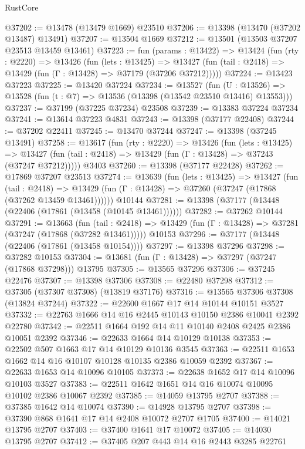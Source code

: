 \begin{lexlean}{RustCore}
\begin{coremodule}
@37202 := @13478 (@13479 @1669) @23510
@37206 := @13398 (@13470 (@37202 @13487) @13491)
@37207 := @13504 @1669
@37212 := @13501 (@13503 @37207 @23513 @13459 @13461)
@37223 := fun (params : @13422) =>
  @13424
    (fun (rty : @2220) =>
    @13426
      (fun (lets : @13425) =>
      @13427 (fun (tail : @2418) => @13429 (fun (Γ : @13428) => @37179 (@37206 @37212)))))
@37224 := @13423 @37223
@37225 := @13420 @37224
@37234 := @13527
    (fun (U : @13526) => @13528 (fun (t : @7) => @13536 (@13398 (@13542 @23510 @13416) @13553)))
@37237 := @37199 (@37225 @37234) @23508
@37239 := @13383 @37224 @37234
@37241 := @13614 @37223 @4831
@37243 := @13398 (@37177 @22408)
@37244 := @37202 @22411
@37245 := @13470 @37244
@37247 := @13398 (@37245 @13491)
@37258 := @13617
    (fun (rty : @2220) =>
    @13426
      (fun (lets : @13425) =>
      @13427 (fun (tail : @2418) => @13429 (fun (Γ : @13428) => @37243 (@37247 @37212)))))
    @3403
@37260 := @13398 (@37177 @22428)
@37262 := @17869 @37207 @23513
@37274 := @13639
    (fun (lets : @13425) =>
    @13427
      (fun (tail : @2418) =>
      @13429 (fun (Γ : @13428) => @37260 (@37247 (@17868 (@37262 @13459 @13461))))))
    @10144
@37281 := @13398 (@37177 (@13448 (@22406 (@17861 (@13458 (@10145 @13461))))))
@37282 := @37262 @10144
@37291 := @13663
    (fun (tail : @2418) => @13429 (fun (Γ : @13428) => @37281 (@37247 (@17868 (@37282 @13461)))))
    @10153
@37296 := @37177 (@13448 (@22406 (@17861 (@13458 @10154))))
@37297 := @13398 @37296
@37298 := @37282 @10153
@37304 := @13681 (fun (Γ : @13428) => @37297 (@37247 (@17868 @37298))) @13795
@37305 := @13565 @37296
@37306 := @37245 @22476
@37307 := @13398 @37306
@37308 := @22480 @37298
@37312 := @37305 (@37307 @37308) (@13819 @37176)
@37316 := @13565 @37306 @37308 (@13824 @37244)
@37322 := @22600 @1667 @17 @14 @10144 @10151 @3527
@37332 := @22763 @1666 @14 @16 @2445 @10143 @10150 @2386 @10041 @2392 @22780
@37342 := @22511 @1664 @192 @14 @11 @10140 @2408 @2425 @2386 @10051 @2392
@37346 := @22633 @1664 @14 @10129 @10138
@37353 := @22502 @507 @1663 @17 @14 @10129 @10136 @3545
@37363 := @22511 @1653 @1662 @14 @16 @10107 @10128 @10135 @2386 @10059 @2392
@37367 := @22633 @1653 @14 @10096 @10105
@37373 := @22638 @1652 @17 @14 @10096 @10103 @3527
@37383 := @22511 @1642 @1651 @14 @16 @10074 @10095 @10102 @2386 @10067 @2392
@37385 := @14059 @13795 @2707
@37388 := @37385 @1642 @14 @10074
@37390 := @14928 @13795 @2707
@37398 := @37390 @868 @1641 @17 @14 @2408 @10072 @2707 @1705
@37400 := @14021 @13795 @2707
@37403 := @37400 @1641 @17 @10072
@37405 := @14030 @13795 @2707
@37412 := @37405 @207 @443 @14 @16 @2443 @3285 @22761

\end{coremodule}
\end{lexlean}
